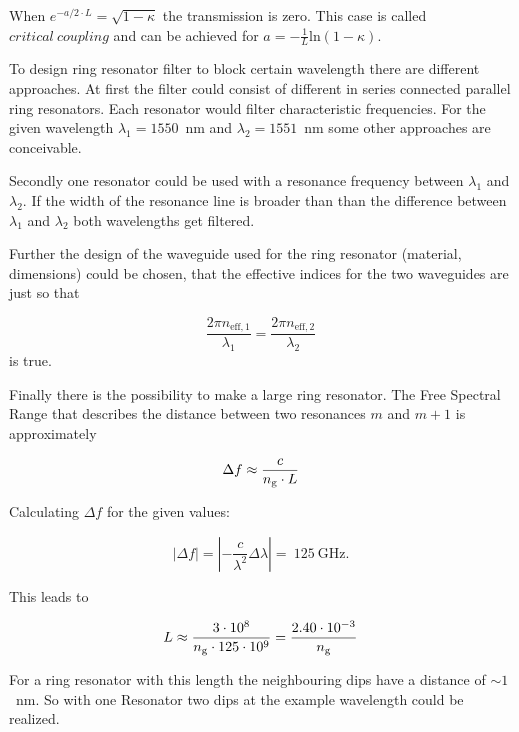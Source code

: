 When $e^{-a/2\cdot L} = \sqrt{1-\kappa}$ the transmission is zero. This case is called $critical~coupling$ and can be achieved for $a = - \frac{1}{L}\mathrm{ln}(1-\kappa)$.

To design ring resonator filter to block certain wavelength there are different approaches.
At first the filter could consist of different in series connected parallel ring resonators. Each resonator would filter characteristic frequencies.
For the given wavelength $\lambda_1 = 1550$~nm and $\lambda_2 = 1551$~nm some other approaches are conceivable.

Secondly one resonator could be used with a resonance frequency between $\lambda_1$ and $\lambda_2$. If the width of the resonance line is broader than than the difference between $\lambda_1$ and $\lambda_2$ both wavelengths get filtered.

Further the design of the waveguide used for the ring resonator (material, dimensions) could be chosen, that the effective indices for the two waveguides are just so that 

\begin{equation}
\frac{2\pi n_{\mathrm{eff,1}}}{\lambda_1} = \frac{2\pi n_{\mathrm{eff,2}}}{\lambda_2}
\label{eq:}
\end{equation}
is true.

Finally there is the possibility to make a large ring resonator. The Free Spectral Range that describes the distance between two resonances $m$ and $m+1$ is approximately

\begin{equation}
\Delta f \approx \frac{c}{n_{\mathrm{g}}\cdot L}
\label{eq:}
\end{equation}

Calculating $\Delta f$ for the given values:

\begin{equation}
|\Delta f| = \left|-\frac{c}{\lambda^2}\Delta\lambda\right| =~125~\mathrm{GHz}.
\label{eq:}
\end{equation}

This leads to 

\begin{equation}
L \approx \frac{3\cdot10^8}{n_{\mathrm{g}}\cdot125\cdot10^9}=\frac{2.40\cdot10^{-3}}{n_{\mathrm{g}}}
\label{eq:}
\end{equation}

For a ring resonator with this length the neighbouring dips have a distance of $\sim1$~nm. So with one Resonator two dips at the example wavelength could be realized.


